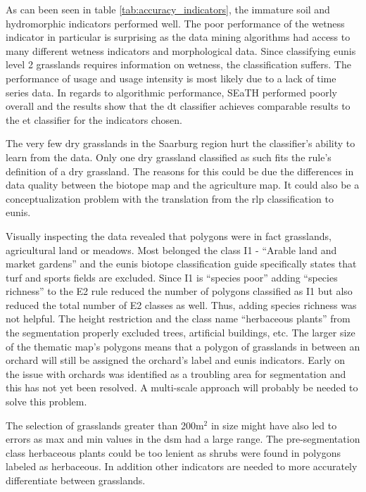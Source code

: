 \documentclass[authoryear,review,12pt,number]{elsarticle}
\begin{document}
As can been seen in table \ref{tab:accuracy_indicators}, the immature soil and
hydromorphic indicators performed well. The poor performance of the wetness
indicator in particular is surprising as the data mining algorithms had 
access to many different wetness indicators and morphological data. Since 
classifying \gls{eunis} level 2 grasslands requires information on wetness, 
the classification suffers. The performance of usage and usage intensity is 
most likely due to a lack of time series data. In regards to algorithmic 
performance, SEaTH performed poorly overall and the results show that the 
\gls{dt} classifier achieves comparable results to the \gls{et} classifier 
for the indicators chosen. 

The very few dry grasslands in the Saarburg region hurt the classifier's 
ability to learn from the data. Only one dry grassland classified as such fits 
the rule's definition of a dry grassland. The reasons for this could be due the 
differences in data quality between the biotope map and the agriculture map. 
It could also be a conceptualization problem with the translation from the 
\gls{rlp} classification to \gls{eunis}.

Visually inspecting the data revealed that polygons were in fact grasslands, 
agricultural land or meadows. Most belonged the class I1 - ``Arable land and 
market gardens'' and the \gls{eunis} biotope classification guide specifically 
states that turf and sports fields are excluded. Since I1 is ``species poor'' 
adding ``species richness'' to the E2 rule reduced the number of polygons 
classified as I1 but also reduced the total number of E2 classes as well. Thus, 
adding species richness was not helpful. The height restriction and the class 
name ``herbaceous plants'' from the segmentation properly excluded trees, 
artificial buildings, etc. The larger size of the thematic map's polygons means 
that a polygon of grasslands in between an orchard will still be assigned the 
orchard's label and \gls{eunis} indicators. Early on the issue with orchards 
was identified as a troubling area for segmentation and this has not yet been 
resolved. A multi-scale approach will probably be needed to solve this problem. 

The selection of grasslands greater than 200m$^{2}$ in size might have also led 
to errors as max and min values in the \gls{dsm} had a large range. The 
pre-segmentation class herbaceous plants could be too lenient as shrubs were 
found in polygons labeled as herbaceous. In addition other indicators are 
needed to more accurately differentiate between grasslands.
\end{document}
